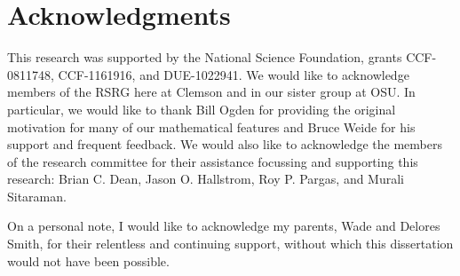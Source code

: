 \chapter*{Acknowledgments}
This research was supported by the National Science Foundation, grants CCF-0811748, CCF-1161916, and DUE-1022941.  We would like to acknowledge members of the RSRG here at Clemson and in our sister group at OSU.  In particular, we would like to thank Bill Ogden for providing the original motivation for many of our mathematical features and Bruce Weide for his support and frequent feedback.  We would also like to acknowledge the members of the research committee for their assistance focussing and supporting this research: Brian C. Dean, Jason O. Hallstrom, Roy P. Pargas, and Murali Sitaraman.

On a personal note, I would like to acknowledge my parents, Wade and Delores Smith, for their relentless and continuing support, without which this dissertation would not have been possible.
